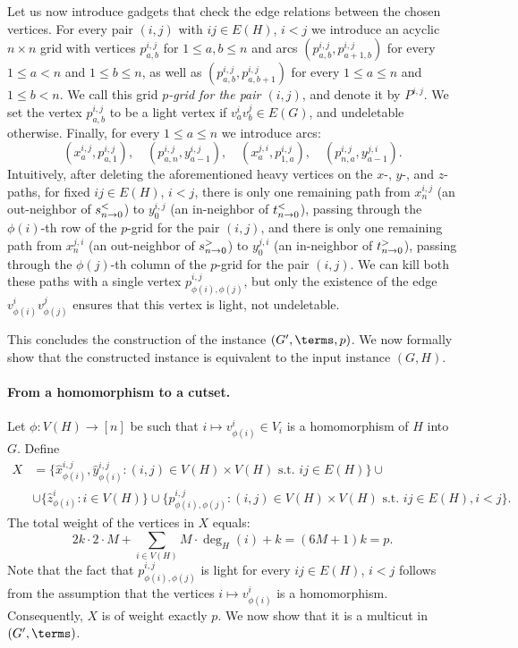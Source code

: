 Let us now introduce gadgets that check the edge relations between the chosen vertices.
For every pair $(i,j)$ with $ij \in E(H)$, $i < j$ we introduce an acyclic $n \times n$ grid with vertices $p^{i,j}_{a,b}$ for $1 \leq a,b \leq n$
and arcs $(p^{i,j}_{a,b}, p^{i,j}_{a+1,b})$ for every $1 \leq a < n$ and $1 \leq b \leq n$, as well as 
$(p^{i,j}_{a,b}, p^{i,j}_{a,b+1})$ for every $1 \leq a \leq n$ and $1 \leq b < n$.
We call this grid \emph{$p$-grid for the pair $(i,j)$}, and denote it by $P^{i,j}$.
We set the vertex $p^{i,j}_{a,b}$ to be a light vertex if $v^i_a v^j_b \in E(G)$, and undeletable otherwise.
Finally, for every $1 \leq a \leq n$ we introduce arcs:
$$(x^{i,j}_a, p^{i,j}_{a,1}),\quad (p^{i,j}_{a,n}, y^{i,j}_{a-1}),\quad (x^{j,i}_a,p^{i,j}_{1,a}), \quad (p^{i,j}_{n,a}, y^{j,i}_{a-1}).$$
Intuitively, after deleting the aforementioned heavy vertices on the $x$-, $y$-, and $z$-paths, for fixed $ij \in E(H)$, $i < j$,
there is only one remaining path from $x^{i,j}_n$ (an out-neighbor of $s_{n \to 0}^{<}$) to $y^{i,j}_0$ (an in-neighbor of $t_{n \to 0}^{<}$),
passing through the $\phi(i)$-th row of the $p$-grid for the pair $(i,j)$,
and there is only one remaining path from $x^{j,i}_n$ (an out-neighbor of $s_{n \to 0}^{>}$) to $y^{j,i}_0$ (an in-neighbor of $t_{n \to 0}^{>}$),
passing through the $\phi(j)$-th column of the $p$-grid for the pair $(i,j)$.
We can kill both these paths with a single vertex $p^{i,j}_{\phi(i),\phi(j)}$, but only
the existence of the edge $v^i_{\phi(i)} v^j_{\phi(j)}$ ensures that this vertex is light, not undeletable.

This concludes the construction of the instance $(G',\terms,p)$.
We now formally show that the constructed instance is equivalent to the input
\subiso{} instance $(G,H)$.

\paragraph{From a homomorphism to a cutset.}
Let $\phi:V(H) \to [n]$ be such that $i \mapsto v^i_{\phi(i)} \in V_i$
is a homomorphism of $H$ into $G$.
Define
\begin{equation*}
\begin{split}
X &= \{\hat{x}^{i,j}_{\phi(i)}, \hat{y}^{i,j}_{\phi(i)} : (i,j) \in V(H) \times V(H) \textrm{\ s.t.\ }ij \in E(H)\}
\cup \\ &\cup \{\hat{z}^i_{\phi(i)} : i \in V(H) \}
\cup \{p^{i,j}_{\phi(i),\phi(j)} : (i,j) \in V(H) \times V(H) \textrm{\ s.t.\ }ij \in E(H), i < j\}.
\end{split}
\end{equation*}
The total weight of the vertices in $X$ equals:
$$2k \cdot 2 \cdot M + \sum_{i \in V(H)} M \cdot \deg_H(i) + k = (6M+1)k = p.$$
Note that the fact that 
$p^{i,j}_{\phi(i),\phi(j)}$ is light for every $ij \in E(H)$, $i < j$
follows from the assumption that the vertices $i \mapsto v^i_{\phi(i)}$ 
is a homomorphism.
Consequently, $X$ is of weight exactly $p$. We now show that it is a multicut in $(G',\terms)$.


